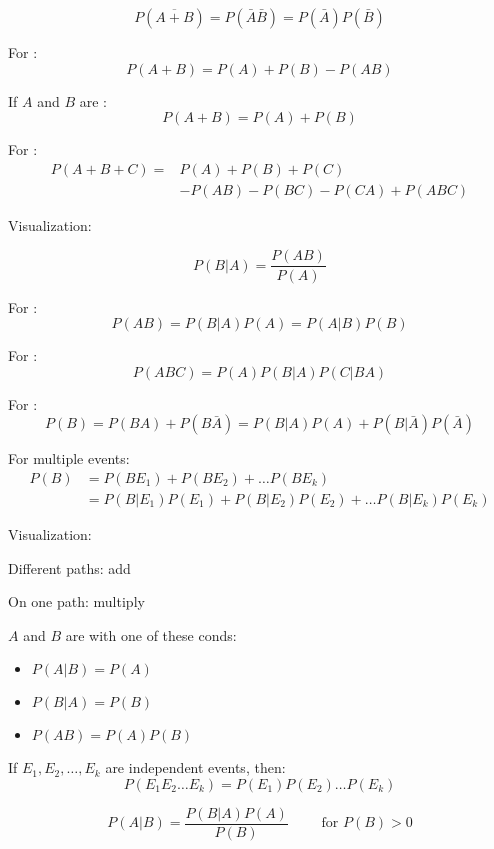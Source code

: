 \begin{multicols*}{3}
      \[
        P(\overline{A + B}) = P(\bar{A} \bar{B}) = P(\bar{A}) P(\bar{B})
      \]

    \par For :
      \[
        P(A + B) = P(A) + P(B) - P(AB)
      \]
    \par If $A$ and $B$ are :
      \[
        P(A + B) = P(A) + P(B)
      \]
    \par For :
    \begin{align*}
    P(A + B  + C) = &P(A) + P(B) + P(C) \\ &- P(AB) - P(BC) - P(CA) + P(ABC)
    \end{align*}
    \par Visualization: 

    \[
      P(B|A) = \frac{P(AB)}{P(A)}
    \]

      \par For :
        \[
          P(AB) = P(B|A) P(A) = P(A|B) P(B)
        \]
      \par For :
        \[
          P(ABC) = P(A) P(B|A) P(C|BA)
        \]

      \par For :
        \[
          P(B) = P(BA) + P(B\bar{A}) = P(B|A) P(A) + P(B|\bar{A}) P(\bar{A})
        \]
      \par For multiple events:
        \begin{align*}
                P(B) &= P(BE_1) + P(BE_2) + \ldots P(BE_k) \\
               &= P(B|E_1) P(E_1) + P(B|E_2) P(E_2) + \ldots P(B|E_k) P(E_k)
        \end{align*}
      \par Visualization: 

      \par Different paths: add
      \par On one path: multiply

      \par $A$ and $B$ are  with one of these conds:
        \begin{itemize}[noitemsep]
          \item $P(A|B) = P(A)$
          \item $P(B|A) = P(B)$
          \item $P(AB) = P(A) P(B)$
        \end{itemize}
      \par If $E_1, E_2, \ldots, E_k$ are independent events, then:
        \[
          P(E_1 E_2 \ldots E_k) = P(E_1) P(E_2) \ldots P(E_k)
        \]

    \[
      P(A|B) = \frac{P(B|A) P(A)}{P(B)} \qquad \mbox{ for } P(B) > 0
    \]

\end{multicols*}
